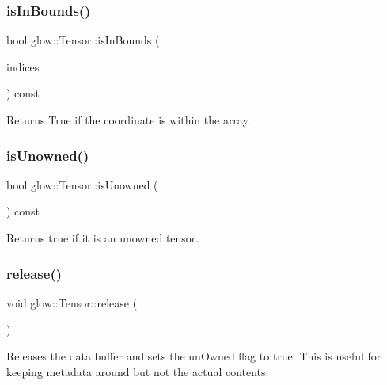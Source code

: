 \subsubsection{\texorpdfstring{is\+In\+Bounds()}{isInBounds()}}
{\footnotesize\ttfamily bool glow\+::\+Tensor\+::is\+In\+Bounds (\begin{DoxyParamCaption}\item[{llvm\+::\+Array\+Ref$<$ size\+\_\+t $>$}]{indices }\end{DoxyParamCaption}) const\hspace{0.3cm}{\ttfamily [inline]}}

\begin{DoxyReturn}{Returns}
True if the coordinate is within the array. 
\end{DoxyReturn}
\mbox{\label{classglow_1_1_tensor_a574b58e799067a444cb639d0e7791b47}} 
\subsubsection{\texorpdfstring{is\+Unowned()}{isUnowned()}}
{\footnotesize\ttfamily bool glow\+::\+Tensor\+::is\+Unowned (\begin{DoxyParamCaption}{ }\end{DoxyParamCaption}) const\hspace{0.3cm}{\ttfamily [inline]}}

\begin{DoxyReturn}{Returns}
true if it is an unowned tensor. 
\end{DoxyReturn}
\mbox{\label{classglow_1_1_tensor_a683bda6d887705f654f3dab72cd384a8}} 
\subsubsection{\texorpdfstring{release()}{release()}}
{\footnotesize\ttfamily void glow\+::\+Tensor\+::release (\begin{DoxyParamCaption}{ }\end{DoxyParamCaption})\hspace{0.3cm}{\ttfamily [inline]}}

Releases the data buffer and sets the un\+Owned flag to true. This is useful for keeping metadata around but not the actual contents. \mbox{\label{classglow_1_1_tensor_aac6a485f0e461c1be799b7b8ad3b985e}} 
